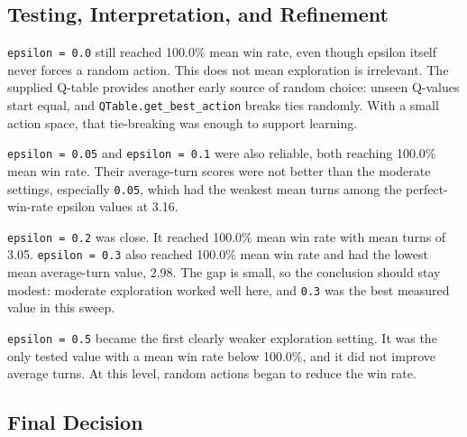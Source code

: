 \documentclass[11pt,a4paper]{article}
\begin{document}
\subsection{Testing, Interpretation, and Refinement}

\texttt{epsilon = 0.0} still reached 100.0\% mean win rate, even though epsilon itself never forces a random action. This does not mean exploration is irrelevant. The supplied Q-table provides another early source of random choice: unseen Q-values start equal, and \texttt{QTable.get\_best\_action} breaks ties randomly. With a small action space, that tie-breaking was enough to support learning.

\texttt{epsilon = 0.05} and \texttt{epsilon = 0.1} were also reliable, both reaching 100.0\% mean win rate. Their average-turn scores were not better than the moderate settings, especially \texttt{0.05}, which had the weakest mean turns among the perfect-win-rate epsilon values at 3.16.

\texttt{epsilon = 0.2} was close. It reached 100.0\% mean win rate with mean turns of 3.05. \texttt{epsilon = 0.3} also reached 100.0\% mean win rate and had the lowest mean average-turn value, 2.98. The gap is small, so the conclusion should stay modest: moderate exploration worked well here, and \texttt{0.3} was the best measured value in this sweep.

\texttt{epsilon = 0.5} became the first clearly weaker exploration setting. It was the only tested value with a mean win rate below 100.0\%, and it did not improve average turns. At this level, random actions began to reduce the win rate.

\subsection{Final Decision}
\end{document}
